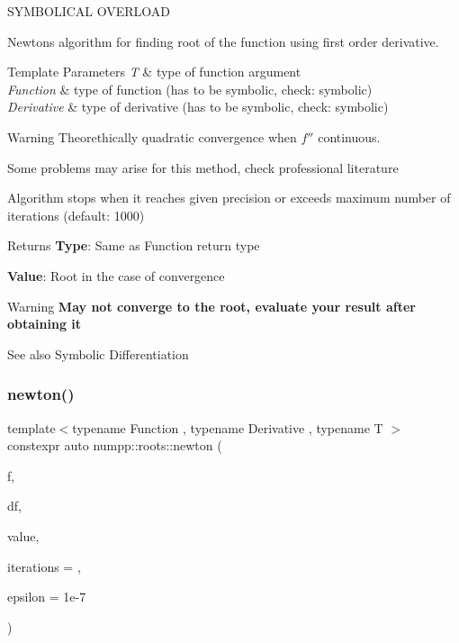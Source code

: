 S\+Y\+M\+B\+O\+L\+I\+C\+AL O\+V\+E\+R\+L\+O\+AD

Newton\textquotesingle{}s algorithm for finding root of the function using first order derivative.


\begin{DoxyTemplParams}{Template Parameters}
{\em T} & type of function argument \\
\hline
{\em Function} & type of function (has to be symbolic, check\+: symbolic) \\
\hline
{\em Derivative} & type of derivative (has to be symbolic, check\+: symbolic)\\
\hline
\end{DoxyTemplParams}
\begin{DoxyWarning}{Warning}
Theorethically quadratic convergence when $f''$ continuous.

Some problems may arise for this method, check professional literature
\end{DoxyWarning}
Algorithm stops when it reaches given precision or exceeds maximum number of iterations (default\+: 1000)

\begin{DoxyReturn}{Returns}
{\bfseries Type}\+: Same as Function return type 

{\bfseries Value}\+: Root in the case of convergence
\end{DoxyReturn}
\begin{DoxyWarning}{Warning}
{\bfseries May not converge to the root, evaluate your result after obtaining it}
\end{DoxyWarning}
\begin{DoxySeeAlso}{See also}
Symbolic Differentiation
\end{DoxySeeAlso}
\mbox{\label{group__numpp__roots_ga0c3358cbe925f1840d2332f81dec42ab}} 
\subsubsection{\texorpdfstring{newton()}{newton()}\hspace{0.1cm}{\footnotesize\ttfamily [2/3]}}
{\footnotesize\ttfamily template$<$typename Function , typename Derivative , typename T $>$ \\
constexpr auto numpp\+::roots\+::newton (\begin{DoxyParamCaption}\item[{Function \&\&}]{f,  }\item[{Derivative \&\&}]{df,  }\item[{T \&\&}]{value,  }\item[{std\+::size\+\_\+t}]{iterations = {},  }\item[{const double}]{epsilon = {\ttfamily 1e-\/7} }\end{DoxyParamCaption})}

